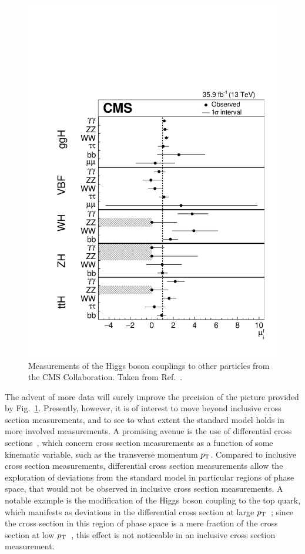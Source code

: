 \begin{figure}[hbtp]
  \begin{center}
    \includegraphics[width=0.7\linewidth]{img/theory/grandcomb/productiondecay.pdf}
    \caption{%
        Measurements of the Higgs boson couplings to other particles from the CMS Collaboration.
        Taken from Ref.~\cite{Sirunyan:2018koj}.
        }
    \label{fig:productiondecay}
  \end{center}
\end{figure}


The advent of more data will surely improve the precision of the picture provided by Fig.~\ref{fig:productiondecay}.
% 
Presently, however, it is of interest to move beyond inclusive cross section measurements, and to see to what extent the standard model holds in more involved measurements.
% 
A promising avenue is the use of differential cross sections~\cite{Aad:2014lwa,Khachatryan:2015rxa,Aad:2014tca,Khachatryan:2015yvw,Aad:2016lvc,Khachatryan:2016vnn,Aaboud:2018xdt,Sirunyan:2018kta,Aaboud:2017oem,CMS_AN_2016-442,Aaboud:2018ezd}, which concern cross section measurements as a function of some kinematic variable, such as the transverse momentum $p_\mathrm{T}$.
% 
Compared to inclusive cross section measurements, differential cross section measurements allow the exploration of deviations from the standard model in particular regions of phase space, that would not be observed in inclusive cross section measurements.
% 
A notable example is the modification of the Higgs boson coupling to the top quark, which manifests as deviations in the differential cross section at large $p_\mathrm{T}$~\cite{kt-modification-of-high-pt-spectrum}; since the cross section in this region of phase space is a mere fraction of the cross section at low $p_\mathrm{T}$~\cite{sm-pt-spectrum}, this effect is not noticeable in an inclusive cross section measurement.


